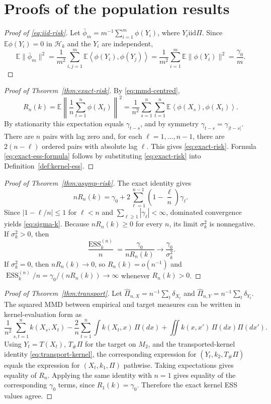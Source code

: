 \documentclass[11pt]{article}
\newcommand{\E}{\mathbb{E}}
\newcommand{\1}{\mathbf{1}}
\newcommand{\inner}[2]{\left\langle #1, #2 \right\rangle}
\newcommand{\ESS}{\operatorname{ESS}}
\newcommand{\iid}{\mathrm{iid}}
\newcommand{\Hk}{\mathcal{H}_k}
\begin{document}



\appendix
\section{Proofs of the population results}
\label{app:proofs}

\begin{proof}[Proof of \eqref{eq:iid-risk}]
Let $\bar\phi_m=m^{-1}\sum_{i=1}^m\phi(Y_i)$, where $Y_i\iid\Pi$. Since $\E\phi(Y_i)=0$ in $\Hk$ and the $Y_i$ are independent,
\[
\E\|\bar\phi_m\|^2
=\frac{1}{m^2}\sum_{i,j=1}^m\E\inner{\phi(Y_i)}{\phi(Y_j)}
=\frac{1}{m^2}\sum_{i=1}^m\E\|\phi(Y_i)\|^2
=\frac{\gamma_0}{m}.
\]
\end{proof}

\begin{proof}[Proof of Theorem~\ref{thm:exact-risk}]
By \eqref{eq:mmd-centred},
\[
R_n(k)=
\E\left\|\frac1n\sum_{t=1}^n\phi(X_t)\right\|^2
=
\frac1{n^2}\sum_{s=1}^n\sum_{t=1}^n
\E\inner{\phi(X_s)}{\phi(X_t)}.
\]
By stationarity this expectation equals $\gamma_{t-s}$, and by symmetry $\gamma_{t-s}=\gamma_{|t-s|}$. There are $n$ pairs with lag zero and, for each $\ell=1,\ldots,n-1$, there are $2(n-\ell)$ ordered pairs with absolute lag $\ell$. This gives \eqref{eq:exact-risk}. Formula \eqref{eq:exact-ess-formula} follows by substituting \eqref{eq:exact-risk} into Definition~\ref{def:kernel-ess}.
\end{proof}

\begin{proof}[Proof of Theorem~\ref{thm:asymp-risk}]
The exact identity gives
\[
nR_n(k)=\gamma_0+2\sum_{\ell=1}^{n-1}\left(1-\frac{\ell}{n}\right)\gamma_\ell.
\]
Since $|1-\ell/n|\le1$ for $\ell<n$ and $\sum_{\ell\ge1}|\gamma_\ell|<\infty$, dominated convergence yields \eqref{eq:sigma-k}. Because $nR_n(k)\ge0$ for every $n$, its limit $\sigma_k^2$ is nonnegative. If $\sigma_k^2>0$, then
\[
\frac{\ESS_k^{(n)}}{n}
=\frac{\gamma_0}{nR_n(k)}\to \frac{\gamma_0}{\sigma_k^2}.
\]
If $\sigma_k^2=0$, then $nR_n(k)\to0$, so $R_n(k)=o(n^{-1})$ and $\ESS_k^{(n)}/n=\gamma_0/(nR_n(k))\to\infty$ whenever $R_n(k)>0$.
\end{proof}

\begin{proof}[Proof of Theorem~\ref{thm:transport}]
Let $\hat\Pi_{n,X}=n^{-1}\sum_t\delta_{X_t}$ and $\hat\Pi_{n,Y}=n^{-1}\sum_t\delta_{Y_t}$. The squared MMD between empirical and target measures can be written in kernel-evaluation form as
\[
\frac1{n^2}\sum_{s,t=1}^n k(X_s,X_t)
-\frac2n\sum_{t=1}^n\int k(X_t,x)\,\Pi(dx)
+\iint k(x,x')\,\Pi(dx)\Pi(dx').
\]
Using $Y_t=T(X_t)$, $T_\#\Pi$ for the target on $M_2$, and the transported-kernel identity \eqref{eq:transport-kernel}, the corresponding expression for $(Y_t,k_2,T_\#\Pi)$ equals the expression for $(X_t,k_1,\Pi)$ pathwise. Taking expectations gives equality of $R_n$. Applying the same identity with $n=1$ gives equality of the corresponding $\gamma_0$ terms, since $R_1(k)=\gamma_0$. Therefore the exact kernel ESS values agree.
\end{proof}
\end{document}
